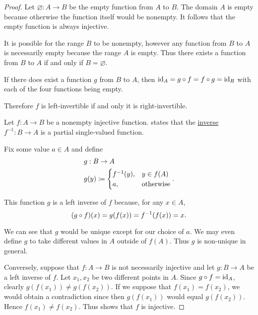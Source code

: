 \begin{proof}
   Let \( \varnothing: A \to B \) be the empty function from \( A \) to \( B \). The domain \( A \) is empty because otherwise the function itself would be nonempty. It follows that the empty function is always injective.

  It is possible for the range \( B \) to be nonempty, however any function from \( B \) to \( A \) is necessarily empty because the range \( A \) is empty. Thus there exists a function from \( B \) to \( A \) if and only if \( B = \varnothing \).

  If there does exist a function \( g \) from \( B \) to \( A \), then \( \operatorname{id}_A = g \mathbin \circ f = f \mathbin \circ g = \operatorname{id}_B \) with each of the four functions being empty.

  Therefore \( f \) is left-invertible if and only it is right-invertible.

   Let \( f: A \to B \) be a nonempty injective function.  states that the \hyperref[def:multi_valued_function/inverse]{inverse} \( f^{-1}: B \to A \) is a partial single-valued function.

  Fix some value \( a \in A \) and define
  \begin{equation*}
    \begin{aligned}
      &g: B \to A \\
      &g(y) \coloneqq \begin{cases}
        f^{-1}(y), &y \in f(A) \\
        a, &\T{otherwise}
      \end{cases}.
    \end{aligned}
  \end{equation*}

  This function \( g \) is a left inverse of \( f \) because, for any \( x \in A \),
  \begin{equation*}
    (g \mathbin \circ f)(x)
    =
    g(f(x))
    =
    f^{-1}(f(x))
    =
    x.
  \end{equation*}

  We can see that \( g \) would be unique except for our choice of \( a \). We may even define \( g \) to take different values in \( A \) outside of \( f(A) \). Thus \( g \) is non-unique in general.

  Conversely, suppose that \( f: A \to B \) is not necessarily injective and let \( g: B \to A \) be a left inverse of \( f \). Let \( x_1, x_2 \) be two different points in \( A \). Since \( g \mathbin \circ f = \operatorname{id}_A \), clearly \( g(f(x_1)) \neq g(f(x_2)) \). If we suppose that \( f(x_1) = f(x_2) \), we would obtain a contradiction since then \( g(f(x_1)) \) would equal \( g(f(x_2)) \). Hence \( f(x_1) \neq f(x_2) \). Thus shows that \( f \) is injective.


\end{proof}
